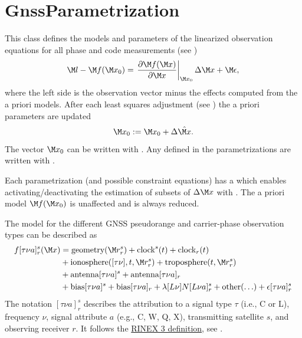 \section{GnssParametrization}\label{gnssParametrizationType}
This class defines the models and parameters of the linearized observation equations
for all phase and code measurements (see )
\begin{equation}\label{gnssParametrizationType:model}
  \M l - \M f(\M x_0) = \left.\frac{\partial \M f(\M x)}{\partial \M x}\right|_{\M x_0} \Delta\M x + \M\epsilon,
\end{equation}
where the left side is the observation vector minus the effects computed from the a priori models.
After each least squares adjustment
(see )
the a priori parameters are updated
\begin{equation}\label{gnssParametrizationType:update}
  \M x_0 := \M x_0 + \Delta\hat{\M x}.
\end{equation}
The vector $\M x_0$ can be written with
.
Any  defined in the parametrizations are written with
.

Each parametrization (and possible constraint equations) has a  which enables
activating/deactivating the estimation of subsets of $\Delta\M x$ with
.
The a priori model $\M f(\M x_0)$ is unaffected and is always reduced.

The model for the different GNSS pseudorange and carrier-phase observation types can be described as
\begin{equation}\label{gnssParametrizationType:gnssFullModel}
\begin{split}
  f[\tau\nu a]_r^s(\M x) &= \text{geometry}(\M r_r^s) + \text{clock}^s(t) + \text{clock}_r(t) \\
               &+ \text{ionosphere}([\tau\nu],t,\M r_r^s) + \text{troposphere}(t,\M r_r^s) \\
               &+ \text{antenna}[\tau\nu a]^s  + \text{antenna}[\tau\nu a]_r \\
               &+ \text{bias}[\tau\nu a]^s + \text{bias}[\tau\nu a]_r
               + \lambda[L\nu] N[L\nu a]_r^s + \text{other}(\ldots) + \epsilon[\tau\nu a]_r^s
\end{split}
\end{equation}
The notation $[\tau\nu a]_r^s$ describes the
attribution to a signal type $\tau$ (i.e., C or L), frequency $\nu$,
signal attribute $a$ (e.g., C, W, Q, X), transmitting satellite $s$, and observing receiver $r$.
It follows the \href{https://files.igs.org/pub/data/format/rinex305.pdf}{RINEX 3 definition},
see .

